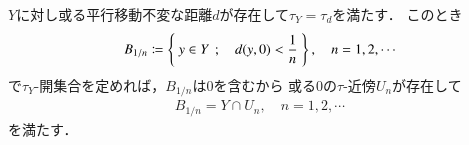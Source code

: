 	\begin{prf}
		$Y$に対し或る平行移動不変な距離$d$が存在して$\tau_Y = \tau_d$を満たす．
		このとき
		\begin{align}
			B_{1/n} \coloneqq \left\{\ y \in Y\ \, ; \quad d(y,0) < \frac{1}{n}\ \right\},
			\quad n=1,2,\cdots
		\end{align}
		で$\tau_Y$-開集合を定めれば，$B_{1/n}$は$0$を含むから
		或る0の$\tau$-近傍$U_n$が存在して
		\begin{align}
			B_{1/n} = Y \cap U_n, \quad n=1,2,\cdots
		\end{align}
		を満たす．
	\end{prf}